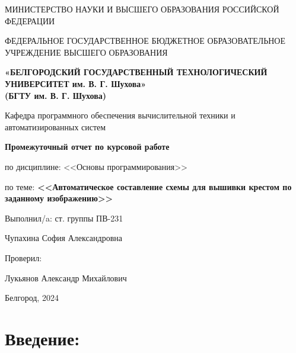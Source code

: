 \documentclass[12pt]{article}
\begin{document}
	\begin{center}
		{\parskip=1cm
			МИНИСТЕРСТВО НАУКИ И ВЫСШЕГО ОБРАЗОВАНИЯ РОССИЙСКОЙ ФЕДЕРАЦИИ
				
			ФЕДЕРАЛЬНОЕ ГОСУДАРСТВЕННОЕ БЮДЖЕТНОЕ ОБРАЗОВАТЕЛЬНОЕ УЧРЕЖДЕНИЕ ВЫСШЕГО ОБРАЗОВАНИЯ
				
			{\bf«БЕЛГОРОДСКИЙ ГОСУДАРСТВЕННЫЙ ТЕХНОЛОГИЧЕСКИЙ УНИВЕРСИТЕТ им. В. Г. Шухова»\\(БГТУ им. В. Г. Шухова)}
				
				
			\begin{figure}[bh]
				\noindent{}
			\end{figure}
			Кафедра программного обеспечения вычислительной техники и автоматизированных систем
		}
		{\parskip=0.25cm
			{\Large 
				{\bf Промежуточный отчет по курсовой работе}
					
				по дисциплине: <<Основы программирования>>
					
				по теме: {\bf <<Автоматическое составление схемы для вышивки крестом по заданному изображению>>}
			}
		}
	\end{center}
	\begin{flushright}
		{\parskip=3cm Выполнил/a: ст. группы ПВ-231}
			
		Чупахина София Александровна
			
		Проверил:
			
		Лукьянов Александр Михайлович
	\end{flushright}
	\begin{center}
		{\parskip=3cm Белгород, 2024}
	\end{center}
	\newpage
		
	\setcounter{secnumdepth}{-1} 
	\tableofcontents
	\newpage	
		
	\section{Введение:}
	\label{intro}
	
\end{document}
